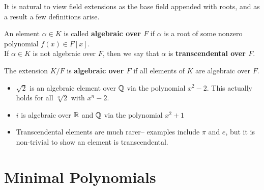 \documentclass{memoir}
\begin{document}


It is natural to view field extensions as the base field appended with roots, and as a result a few definitions arise.

\begin{defn}
	An element \(\alpha \in K\) is called \textbf{algebraic over \(F\)} if \(\alpha \) is a root of some nonzero polynomial \(f(x) \in F[x]\).\\

	If \(\alpha  \in K\) is not algebraic over \(F\), then we say that \(\alpha \) is \textbf{transcendental over \(F\)}.
\end{defn}
The extension \(K / F\) is \textbf{algebraic over \(F\)} if all elements of \(K\) are algebraic over \(F\).

\begin{exmp}
	\begin{itemize}
		\item \(\sqrt{2} \) is an algebraic element over \(\mathbb{Q}\) via the polynomial \(x^2-2\). This actually holds for all \(\sqrt[n]{2} \) with \(x^{n}-2\).
		\item \(i\) is algebraic over \(\mathbb{R}\) and \(\mathbb{Q}\) via the polynomial \(x^2+1\) 
		\item Transcendental elements are much rarer-- examples include \(\pi \) and \(e\), but it is non-trivial to show an element is transcendental.
	\end{itemize}
\end{exmp}

\section{Minimal Polynomials}
\label{sec:minimal_polynomials}
\end{document}
